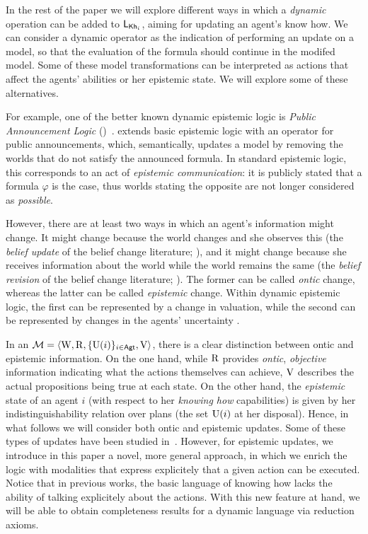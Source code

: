 In the rest of the paper we will explore different ways in which a \emph{dynamic} operation can be added to $\mathsf{L}_{{\sf Kh}_i}$, aiming for updating an agent's know how.   We can consider a dynamic operator as the indication of performing an update on a model, so that the evaluation of the formula should continue in the modifed model.  Some of these model transformations can be interpreted as actions that affect the agents' abilities or her epistemic state. We will explore some of these alternatives.

For example, one of the better known dynamic epistemic logic is \emph{Public Announcement Logic} (\PAL)~\cite{Plaza89:lopc}.  \PAL extends basic epistemic logic with an operator for public announcements, which, semantically, updates a model by removing the worlds that do not satisfy the announced formula. In standard epistemic logic, this corresponds to an act of \emph{epistemic communication}: it is publicly stated that a formula $\varphi$ is the case, thus worlds stating the opposite are not longer considered as \emph{possible}.

However, there are at least two ways in which an agent's information might change. It might change because the world changes and she observes this (the \emph{belief update} of the belief change literature; \cite{sep-logic-belief-revision}), and it might change because she receives information about the world while the world remains the same (the \emph{belief revision} of the belief change literature; \cite{sep-logic-belief-revision}). The former can be called \emph{ontic} change, whereas the latter can be called \emph{epistemic} change. Within dynamic epistemic logic, the first can be represented by a change in valuation, while the second can be represented by changes in the agents' uncertainty \cite{vanDitmarschKooi2008}.

In an \ults $\mathcal{M}=\langle \operatorname{W},\operatorname{R},\{ \operatorname{U}(i) \}_{i\in{\rm \sf Agt}},\operatorname{V} \rangle$, there is a clear distinction between ontic and epistemic information. On the one hand, while $\operatorname{R}$ provides \emph{ontic}, \emph{objective} information indicating what the actions themselves can achieve, $\operatorname{V}$ describes the actual propositions being true at each state. On the other hand, the \emph{epistemic} state of an agent $i$ (with respect to her \emph{knowing how} capabilities) is given by her indistinguishability relation over plans (the set $\operatorname{U}(i)$ at her disposal). Hence, in what follows we will consider both ontic and epistemic updates. Some of these types of updates have been studied in~\cite{AFSV22}. However, for epistemic updates, we introduce in this paper a novel, more general approach, in which we enrich the logic with modalities that express explicitely that a given action can be executed. Notice that in previous works, the basic language of knowing how lacks the ability of talking explicitely about the actions. With this new feature at hand, we will be able to obtain completeness results for a dynamic language via reduction axioms.
